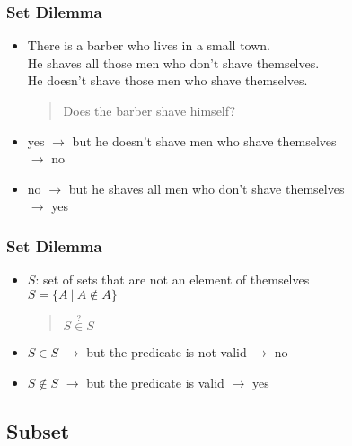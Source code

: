 \documentclass[dvipsnames]{beamer}
\begin{document}
\begin{frame}
  \frametitle{Set Dilemma}

  \begin{itemize}
    \item There is a barber who lives in a small town.\\
      He shaves all those men who don't shave themselves.\\
      He doesn't shave those men who shave themselves.

    \smallskip
    \begin{quote}
      Does the barber shave himself?
    \end{quote}

    \pause
    \item yes $\rightarrow$ but he doesn't shave men who shave themselves\\
      $\rightarrow$ no

    \pause
    \item no $\rightarrow$ but he shaves all men who don't shave themselves\\
      $\rightarrow$ yes
  \end{itemize}
\end{frame}

\begin{frame}
  \frametitle{Set Dilemma}

  \begin{itemize}
    \item $S$: set of sets that are not an element of themselves\\
      $S = \{A~|~A \notin A\}$

    \pause
    \smallskip
    \begin{quote}
      $S \stackrel{?}{\in} S$
    \end{quote}

    \pause
    \item $S \in S$ $\rightarrow$ but the predicate is not valid $\rightarrow$ no

    \pause
    \item $S \notin S$ $\rightarrow$ but the predicate is valid $\rightarrow$ yes
  \end{itemize}
\end{frame}

\subsection{Subset}
\end{document}
